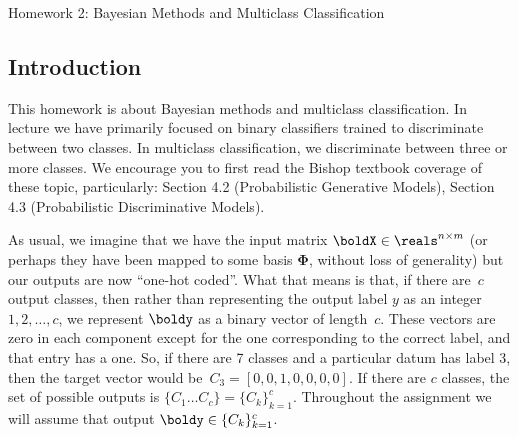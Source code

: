 \documentclass[submit]{harvardml}
\begin{document}
\newcommand{\bx}{\mathbf{x}} %
\newcommand{\bX}{\mathbf{X}} %
\newcommand{\by}{\mathbf{y}} %
\newcommand{\bw}{\mathbf{w}} %
\newcommand{\bS}{\mathbf{S}} %
\newcommand{\bvar}{\mathbf{\sigma}^2} %
\newcommand{\bSig}{\mathbf{\Sigma}} %
\newcommand{\lsum}{\mathlarger{\sum}} %




{
  \begin{center}
{\Large Homework 2: Bayesian Methods and Multiclass Classification}\\
\end{center}
}
\subsection*{Introduction}

This homework is about Bayesian methods 
and  multiclass classification. In lecture we have
primarily focused on binary classifiers trained to discriminate
between two classes. In multiclass classification, we discriminate
between three or more classes. We encourage you to first read the
Bishop textbook coverage of these topic, particularly: Section 4.2
(Probabilistic Generative Models), Section 4.3 (Probabilistic
Discriminative Models).


As usual, we imagine that we have the input matrix $\boldX \in
\reals^{n \times m}$ (or perhaps they have been mapped to some basis
$\bm{\Phi}$, without loss of generality) but our outputs are now
``one-hot coded''.  What that means is that, if there are~$c$ output
classes, then rather than representing the output label $y$ as an
integer~${1,2,\ldots,c}$, we represent $\boldy$ as a binary vector of
length~$c$. These vectors are zero in each
component except for the one corresponding to the correct label, and
that entry has a one.  So, if there are 7 classes and a particular
datum has label 3, then the target vector would be~${C_3 = [0,0,1,0,0,0,0]}$. 
If there are $c$ classes, the set of possible outputs is $\{C_1 \ldots C_c \} = \{C_k\}_{k=1}^c$.
Throughout the assignment we will assume
that output $\boldy \in \{C_k\}_{k=1}^c$.\\
\end{document}
